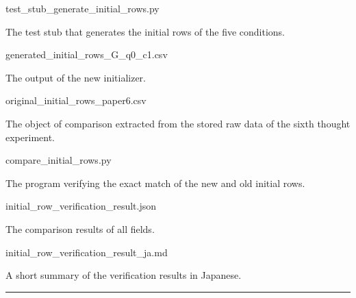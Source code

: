 \documentclass[
  a4paper,
]{article}
\newenvironment{Shaded}{}{}
\newcommand{\NormalTok}[1]{#1}
\begin{document}
\begin{Shaded}
\begin{Highlighting}[]
\NormalTok{test\_stub\_generate\_initial\_rows.py}
\end{Highlighting}
\end{Shaded}

The test stub that generates the initial rows of the five conditions.

\begin{Shaded}
\begin{Highlighting}[]
\NormalTok{generated\_initial\_rows\_G\_q0\_c1.csv}
\end{Highlighting}
\end{Shaded}

The output of the new initializer.

\begin{Shaded}
\begin{Highlighting}[]
\NormalTok{original\_initial\_rows\_paper6.csv}
\end{Highlighting}
\end{Shaded}

The object of comparison extracted from the stored raw data of the sixth
thought experiment.

\begin{Shaded}
\begin{Highlighting}[]
\NormalTok{compare\_initial\_rows.py}
\end{Highlighting}
\end{Shaded}

The program verifying the exact match of the new and old initial rows.

\begin{Shaded}
\begin{Highlighting}[]
\NormalTok{initial\_row\_verification\_result.json}
\end{Highlighting}
\end{Shaded}

The comparison results of all fields.

\begin{Shaded}
\begin{Highlighting}[]
\NormalTok{initial\_row\_verification\_result\_ja.md}
\end{Highlighting}
\end{Shaded}

A short summary of the verification results in Japanese.

\begin{center}\rule{0.5\linewidth}{0.5pt}\end{center}
\end{document}
